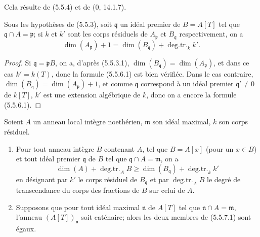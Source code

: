 Cela résulte de (5.5.4) et de (0, 14.1.7).

\begin{corollary}[5.5.6]
\label{IV.2.s5.5.6-fr}
Sous les hypothèses de (5.5.3), soit $\mathfrak q$ un idéal premier de
$B=A[T]$ tel que $\mathfrak q\cap A=\mathfrak p$; si $k$ et $k'$ sont les
corps résiduels de $A_{\mathfrak p}$ et $B_{\mathfrak q}$ respectivement,
on a
\begin{equation}
\dim(A_{\mathfrak p})+1
=\dim(B_{\mathfrak q})+\operatorname{deg.tr.}_k k'.
\tag{5.5.6.1}\label{IV.2.s5.5.6.1-fr}
\end{equation}
\end{corollary}

\begin{proof}

Si $\mathfrak q=\mathfrak pB$, on a, d'après (5.5.3.1),
$\dim(B_{\mathfrak q})=\dim(A_{\mathfrak p})$, et dans ce cas $k'=k(T)$,
donc la formule (5.5.6.1) est bien vérifiée. Dans le cas contraire,
$\dim(B_{\mathfrak q})=\dim(A_{\mathfrak p})+1$, et comme $\mathfrak q$
correspond à un idéal premier $\mathfrak q'\ne0$ de $k[T]$, $k'$ est une
extension algébrique de $k$, donc on a encore la formule (5.5.6.1).
\end{proof}

\begin{lemma}[5.5.7]
\label{IV.2.s5.5.7-fr}
Soient $A$ un anneau local intègre noethérien, $\mathfrak m$ son idéal
maximal, $k$ son corps résiduel.
\begin{enumerate}
\item[(i)] Pour tout anneau intègre $B$ contenant $A$, tel que $B=A[x]$
(pour un $x\in B$) et tout idéal premier $\mathfrak q$ de $B$ tel que
$\mathfrak q\cap A=\mathfrak m$, on a
\begin{equation}
\dim(A)+\operatorname{deg.tr.}_A B
\geq\dim(B_{\mathfrak q})+\operatorname{deg.tr.}_k k'
\tag{5.5.7.1}\label{IV.2.s5.5.7.1-fr}
\end{equation}
en désignant par $k'$ le corps résiduel de $B_{\mathfrak q}$ et par
$\operatorname{deg.tr.}_A B$ le degré de transcendance du corps des
fractions de $B$ sur celui de $A$.
\item[(ii)] Supposons que pour tout idéal maximal $\mathfrak n$ de $A[T]$
tel que $\mathfrak n\cap A=\mathfrak m$, l'anneau $(A[T])_{\mathfrak n}$
soit caténaire; alors les deux membres de (5.5.7.1) sont égaux.
\end{enumerate}
\end{lemma}

